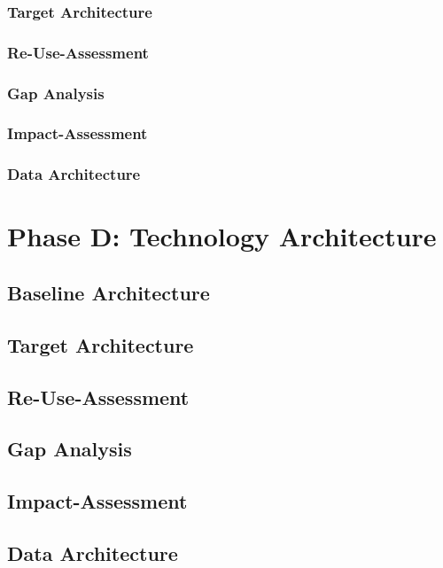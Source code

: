 \subsubsection{Target Architecture}

\subsubsection{Re-Use-Assessment}

\subsubsection{Gap Analysis}

\subsubsection{Impact-Assessment}

\subsubsection{Data Architecture}

\section{Phase D: Technology Architecture}

\subsection{Baseline Architecture}

\subsection{Target Architecture}

\subsection{Re-Use-Assessment}

\subsection{Gap Analysis}

\subsection{Impact-Assessment}

\subsection{Data Architecture}